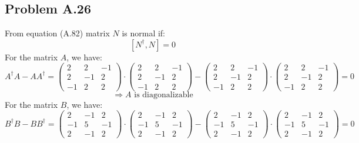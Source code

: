 \documentclass{article}
\begin{document}
\subsection*{Problem A.26}
From equation (A.82) matrix \(N\) is normal if:
\[[N^\dagger, N] = 0\]
For the matrix \(A\), we have: 
\begin{equation*}
    A^\dagger A - AA^\dagger =
    \begin{pmatrix}
        2 & 2 & -1 \\
        2 & -1 & 2 \\
        -1 & 2 & 2 
    \end{pmatrix}
    \cdot
    \begin{pmatrix}
        2 & 2 & -1 \\
        2 & -1 & 2 \\
        -1 & 2 & 2 
    \end{pmatrix}
    - 
    \begin{pmatrix}
        2 & 2 & -1 \\
        2 & -1 & 2 \\
        -1 & 2 & 2 
    \end{pmatrix}
    \cdot
    \begin{pmatrix}
        2 & 2 & -1 \\
        2 & -1 & 2 \\
        -1 & 2 & 2 
    \end{pmatrix}
    = 0
\end{equation*}
\[\Rightarrow A \text{ is diagonalizable}\]
For the matrix \(B\), we have:
\begin{equation*}
    B^\dagger B - BB^\dagger =
    \begin{pmatrix}
        2 & -1 & 2 \\
        -1 & 5 & -1 \\
        2 & -1 & 2
    \end{pmatrix}
    \cdot
    \begin{pmatrix}
        2 & -1 & 2 \\
        -1 & 5 & -1 \\
        2 & -1 & 2
    \end{pmatrix}
    -
    \begin{pmatrix}
        2 & -1 & 2 \\
        -1 & 5 & -1 \\
        2 & -1 & 2
    \end{pmatrix}
    \cdot
    \begin{pmatrix}
        2 & -1 & 2 \\
        -1 & 5 & -1 \\
        2 & -1 & 2
    \end{pmatrix}
    = 0 
\end{equation*}
\end{document}
